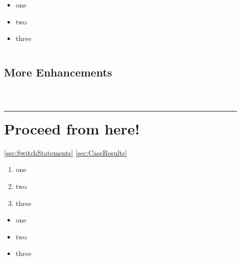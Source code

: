 \begin{itemize}[nosep]
\item{one}
\item{two}
\item{three}
\end{itemize}

\begin{lstlisting}[numbers=left]
\end{lstlisting}

\subsection{More Enhancements}

\hrulefill\newpage 
\section{-------------------------------------------- Proceed from here!}
\ref{sec:SwitchStatements}
\ref{sec:CaseResults}
\autocite{ORACLE_DOC_PATTERNMATCHING}
\autocite{ORACLE_DOC_SWITCHEXPRESSIONS}

\autocite{ORACLE_DOC_LANGUAGE_SPECIFICATION:SwitchExpression}
\autocite{ORACLE_DOC_LANGUAGE_SPECIFICATION:SwitchExpressionBlock}




\autocite{}

\lipsum[1]

\begin{enumerate}[label=P\arabic*.]
\item{one}
\item{two}
\item{three}
\end{enumerate}

\begin{itemize}[nosep]
\item{one}
\item{two}
\item{three}
\end{itemize}

\begin{lstlisting}[numbers=left]
\end{lstlisting}


